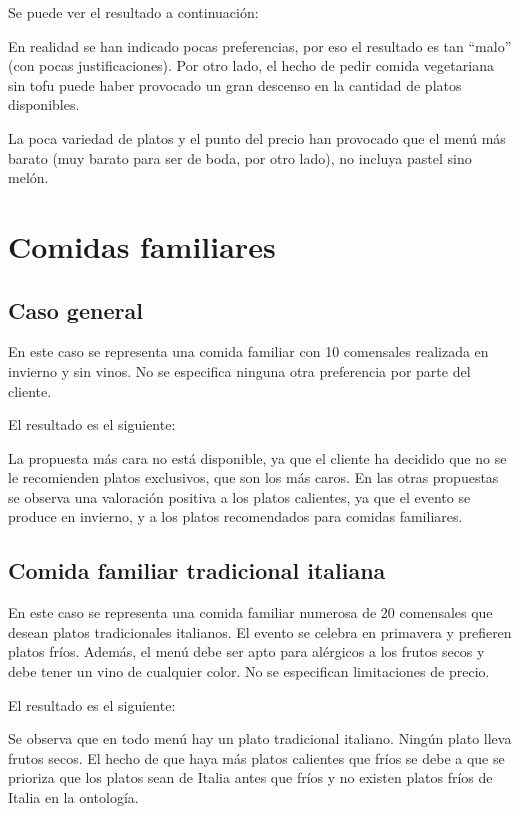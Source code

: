 Se puede ver el resultado a continuación:


En realidad se han indicado pocas preferencias, por eso el resultado es tan
``malo'' (con pocas justificaciones). Por otro lado, el hecho de pedir comida
vegetariana sin tofu puede haber provocado un gran descenso en la cantidad de
platos disponibles.

La poca variedad de platos y el punto del precio han provocado que el menú más
barato (muy barato para ser de boda, por otro lado), no incluya pastel sino
melón.

\section{Comidas familiares}
\subsection{Caso general}
En este caso se representa una comida familiar con 10 comensales realizada en invierno y sin vinos. No se especifica ninguna otra
preferencia por parte del cliente.

El resultado es el siguiente:


La propuesta más cara no está disponible, ya que el cliente ha decidido que no se le recomienden platos exclusivos, que son los más
caros. En las otras propuestas se observa una valoración positiva a los platos calientes, ya que el evento se produce en invierno,
y a los platos recomendados para comidas familiares.

\subsection{Comida familiar tradicional italiana}
En este caso se representa una comida familiar numerosa de 20 comensales que desean platos tradicionales italianos. El evento se
celebra en primavera y prefieren platos fríos. Además, el menú debe ser apto para alérgicos a los frutos secos y debe tener un vino
de cualquier color. No se especifican limitaciones de precio.

El resultado es el siguiente:


Se observa que en todo menú hay un plato tradicional italiano. Ningún plato lleva frutos secos. El hecho de que haya más platos
calientes que fríos se debe a que se prioriza que los platos sean de Italia antes que fríos y no existen platos fríos de Italia en la
ontología.

